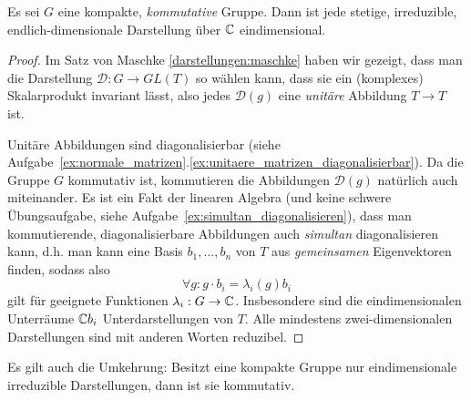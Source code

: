 \begin{theorem}
Es sei $G$ eine kompakte, \emph{kommutative} Gruppe. Dann ist jede stetige, irreduzible, endlich-dimensionale Darstellung über $\mathbb{C}$ eindimensional.
\end{theorem}
\begin{proof}
Im Satz von Maschke \ref{darstellungen:maschke} haben wir gezeigt, dass man die Darstellung $\mathcal{D} : G \to GL(T)$ so wählen kann, dass sie ein (komplexes) Skalarprodukt invariant lässt, also jedes $\mathcal{D}(g)$ eine \emph{unitäre} Abbildung $T\to T$ ist.

Unitäre Abbildungen sind diagonalisierbar (siehe Aufgabe~\ref{ex:normale_matrizen}.\ref{ex:unitaere_matrizen_diagonalisierbar}). Da die Gruppe $G$ kommutativ ist, kommutieren die Abbildungen $\mathcal{D}(g)$ natürlich auch miteinander. Es ist ein Fakt der linearen Algebra (und keine schwere Übungsaufgabe, siehe Aufgabe~\ref{ex:simultan_diagonalisieren}), dass man kommutierende, diagonalisierbare Abbildungen auch \emph{simultan} diagonalisieren kann, d.h. man kann eine Basis $b_1, \ldots, b_n$ von $T$ aus \emph{gemeinsamen} Eigenvektoren finden, sodass also
\[\forall g: g\cdot b_i = \lambda_i(g) b_i\]
gilt für geeignete Funktionen $\lambda_i: G\to\mathbb{C}$. Insbesondere sind die eindimensionalen Unterräume $\mathbb{C} b_i$ Unterdarstellungen von $T$. Alle mindestens zwei-dimensionalen Darstellungen sind mit anderen Worten reduzibel.
\end{proof}

\begin{remark}
Es gilt auch die Umkehrung: Besitzt eine kompakte Gruppe nur eindimensionale irreduzible Darstellungen, dann ist sie kommutativ.
\end{remark}

